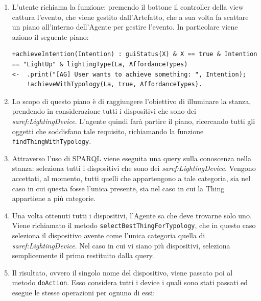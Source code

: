\documentclass[12pt,a4paper,openright,oneside]{report}
\begin{document}
\begin{enumerate}
	\item L'utente richiama la funzione: premendo il bottone il controller della view cattura l'evento, che viene gestito dall'Artefatto, che a sua volta fa scattare un piano all'interno dell'Agente per gestire l'evento. In particolare viene aziono il seguente piano:
	
	\begin{lstlisting}
+achieveIntention(Intention) : guiStatus(X) & X == true & Intention == "LightUp" & lightingType(La, AffordanceTypes)
<-  .print("[AG] User wants to achieve something: ", Intention);
	!achieveWithTypology(La, true, AffordanceTypes).
	\end{lstlisting}

	\item Lo scopo di questo piano è di raggiungere l'obiettivo di illuminare la stanza, prendendo in considerazione tutti i dispositivi che sono dei \textit{saref:LightingDevice}. L'agente quindi farà partire il piano, ricercando tutti gli oggetti che soddisfano tale requisito, richiamando la funzione \texttt{findThingWithTypology}.
	
	\item Attraverso l'uso di SPARQL viene eseguita una query sulla conoscenza nella stanza: seleziona tutti i dispositivi che sono dei \textit{saref:LightingDevice}. Vengono accettati, al momento, tutti quelli che appartengono a tale categoria, sia nel caso in cui questa fosse l'unica presente, sia nel caso in cui la Thing appartiene a più categorie.
	
	\item Una volta ottenuti tutti i dispositivi, l'Agente sa che deve trovarne solo uno. Viene richiamato il metodo \texttt{selectBestThingForTypology}, che in questo caso seleziona il dispositivo avente come l'unica categoria quella di \textit{saref:LightingDevice}. Nel caso in cui vi siano più dispositivi, seleziona semplicemente il primo restituito dalla query.
	
	\item Il risultato, ovvero il singolo nome del dispositivo, viene passato poi al metodo \texttt{doAction}. Esso considera tutti i device i quali sono stati passati ed esegue le stesse operazioni per ognuno di essi:
	

\end{enumerate}
\end{document}
